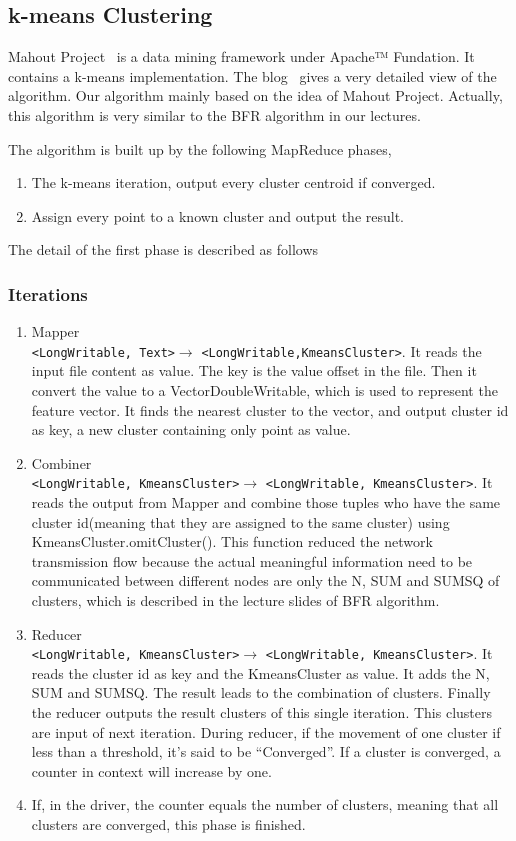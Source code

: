 \documentclass[a4paper,11pt]{article}
\begin{document}
\subsection{k-means Clustering}
Mahout Project~\cite{apache:mahout} is a data mining framework under Apache™
Fundation. It contains a k-means implementation. The blog~\cite{algo:kmeans3}
gives a very detailed view of the algorithm. Our algorithm mainly based on the
idea of Mahout Project. Actually, this algorithm is very similar to the BFR
algorithm in our lectures.

The algorithm is built up by the following MapReduce phases,
\begin{enumerate}
  \item The k-means iteration, output every cluster centroid if
  converged.  	
  \item Assign every point to a known cluster and output the result.
\end{enumerate}

The detail of the first phase is described as follows
\subsubsection{Iterations}
\begin{enumerate}
  \item Mapper\\\verb|<LongWritable, Text>|$\rightarrow$
  \verb|<LongWritable,KmeansCluster>|. It reads the input file content as value.
  The key is the value offset in the file. Then it convert the value to a
  VectorDoubleWritable, which is used to represent the feature vector. It finds
  the nearest cluster to the vector, and output cluster id as key, a new cluster
  containing only point as value.
  \item Combiner\\\verb|<LongWritable, KmeansCluster>|$\rightarrow$
  \verb|<LongWritable, KmeansCluster>|. It reads the output from Mapper and
  combine those tuples who have the same cluster id(meaning that they are
  assigned to the same cluster) using KmeansCluster.omitCluster(). This function
  reduced the network transmission flow because the actual meaningful
  information need to be communicated between different nodes are only the N,
  SUM and SUMSQ of clusters, which is described in the lecture slides of BFR algorithm.
  \item Reducer\\\verb|<LongWritable, KmeansCluster>|$\rightarrow$
  \verb|<LongWritable, KmeansCluster>|. It reads the cluster id as key and the
  KmeansCluster as value. It adds the N, SUM and SUMSQ. The result leads to the
  combination of clusters. Finally the reducer outputs the result clusters of
  this single iteration. This clusters are input of next iteration. During
  reducer, if the movement of one cluster if less than a threshold, it's said
  to be ``Converged''. If a cluster is converged, a counter in context will
  increase by one.
  \item If, in the driver, the counter equals the number of clusters, meaning
  that all clusters are converged, this phase is finished.
\end{enumerate} 
\end{document}
